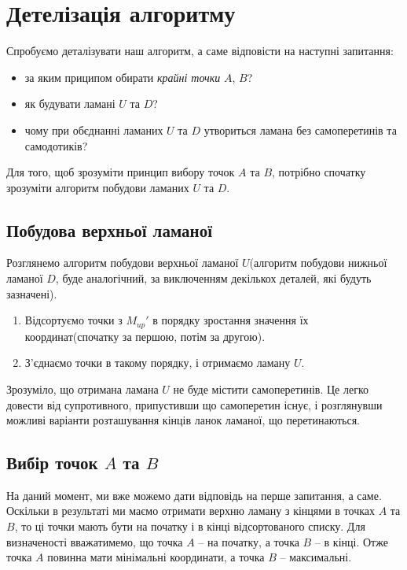 \documentclass[a4paper,12pt,titlepage]{article}
\begin{document}
\newpage

%
%

\section{Детелізація алгоритму}

Спробуємо деталізувати наш алгоритм, а саме відповісти на наступні запитання:

\begin{itemize}
	\item{за яким приципом обирати \emph{крайні точки} $A$, $B$?}
	\item{як будувати ламані $U$ та $D$?}
	\item{чому при обєднанні ламаних $U$ та $D$ утвориться ламана без самоперетинів та самодотиків?}
\end{itemize}

Для того, щоб зрозуміти принцип вибору точок $A$ та $B$, потрібно спочатку зрозуміти алгоритм побудови ламаних $U$ та $D$.\\

\subsection{Побудова верхньої ламаної}

Розглянемо алгоритм побудови верхньої ламаної $U$(алгоритм побудови нижньої ламаної $D$, буде аналогічний, за виключенням декількох деталей, які будуть зазначені).

\begin{enumerate}
	\item{Відсортуємо точки з $M_{up}'$ в порядку зростання значення їх координат(спочатку за першою, потім за другою).}
	\item{З'єднаємо точки в такому порядку, і отримаємо ламану $U$.}
\end{enumerate}

Зрозуміло, що отримана ламана $U$ не буде містити самоперетинів. Це легко довести від супротивного, припустивши що самоперетин існує, і розглянувши можливі варіанти розташування кінців ланок ламаної, що перетинаються.\\

\subsection{Вибір точок $A$ та $B$}

На даний момент, ми вже можемо дати відповідь на перше запитання, а саме. Оскільки в результаті ми маємо отримати верхню ламану з кінцями в точках $A$ та $B$, то ці точки мають бути на початку і в кінці відсортованого списку. Для визначеності вважатимемо, що точка $A$ -- на початку, а точка $B$ -- в кінці. Отже точка $A$ повинна мати мінімальні координати, а точка $B$ -- максимальні.\\
\end{document}
